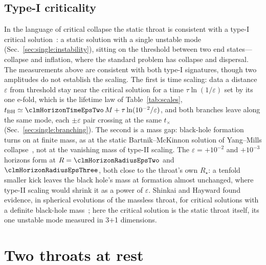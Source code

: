 \documentclass[twocolumn,floatfix,aps,prd,superscriptaddress,nofootinbib]{revtex4-2}
\begin{document}
\subsection{Type-I criticality}
\label{sec:single:critical}

In the language of critical collapse the static throat is consistent with a type-I critical solution~\cite{gundlach2007}: a static solution with a single unstable mode (Sec.~\ref{sec:single:instability}), sitting on the threshold between two end states---collapse and inflation, where the standard problem has collapse and dispersal. The measurements above are consistent with both type-I signatures, though two amplitudes do not establish the scaling. The first is time scaling: data a distance $\varepsilon$ from threshold stay near the critical solution for a time $\tau\ln(1/\varepsilon)$ set by its one e-fold, which is the lifetime law of Table~\ref{tab:scales}, $t_{\rm BH}\simeq\clmHorizonTimeEpsTwo\,M+\tau\ln(10^{-2}/\varepsilon)$, and both branches leave along the same mode, each $\pm\varepsilon$ pair crossing at the same $t_\times$ (Sec.~\ref{sec:single:branching}). The second is a mass gap: black-hole formation turns on at finite mass, as at the static Bartnik--McKinnon solution of Yang--Mills collapse~\cite{choptuik1996}, not at the vanishing mass of type-II scaling. The $\varepsilon=+10^{-2}$ and $+10^{-3}$ horizons form at $R=\clmHorizonRadiusEpsTwo$ and $\clmHorizonRadiusEpsThree$, both close to the throat's own $R_\star$: a tenfold smaller kick leaves the black hole's mass at formation almost unchanged, where type-II scaling would shrink it as a power of $\varepsilon$. Shinkai and Hayward found evidence, in spherical evolutions of the massless throat, for critical solutions with a definite black-hole mass~\cite{shinkai2002}; here the critical solution is the static throat itself, its one unstable mode measured in 3+1 dimensions.

\section{Two throats at rest}
\label{sec:pair}
\end{document}
